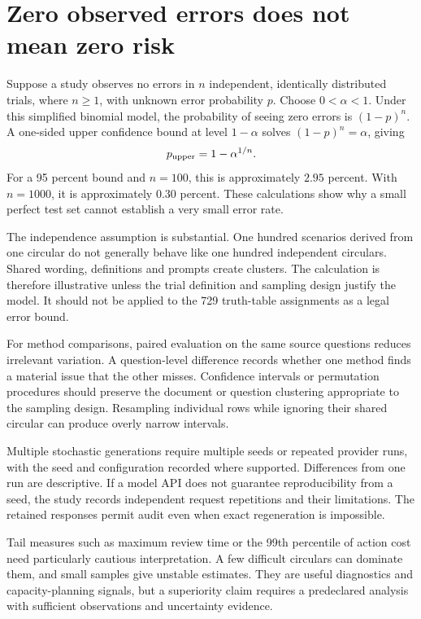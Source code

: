 \section{Zero observed errors does not mean zero risk}
\label{merge:M09:07}


Suppose a study observes no errors in $n$ independent, identically distributed
trials, where $n\geq1$, with unknown error probability $p$. Choose
$0<\alpha<1$. Under this simplified binomial model,
the probability of seeing zero errors is $(1-p)^n$. A one-sided upper confidence
bound at level $1-\alpha$ solves $(1-p)^n=\alpha$, giving
\begin{equation}
 p_{\rm upper}=1-\alpha^{1/n}.
 \label{eq:zero-errors}
\end{equation}
For a 95 percent bound and $n=100$, this is approximately $2.95$ percent. With
$n=1000$, it is approximately $0.30$ percent. These calculations show why a small
perfect test set cannot establish a very small error rate.

The independence assumption is substantial. One hundred scenarios derived from
one circular do not generally behave like one hundred independent circulars.
Shared wording, definitions and prompts create clusters. The calculation is
therefore illustrative unless the trial definition and sampling design justify
the model. It should not be applied to the 729 truth-table assignments as a legal
error bound.


For method comparisons, paired evaluation on the same source questions reduces
irrelevant variation. A question-level difference records whether one method
finds a material issue that the other misses. Confidence intervals or permutation
procedures should preserve the document or question clustering appropriate to the
sampling design. Resampling individual rows while ignoring their shared circular
can produce overly narrow intervals.

Multiple stochastic generations require multiple seeds or repeated provider runs,
with the seed and configuration recorded where supported. Differences from one
run are descriptive. If a model API does not guarantee reproducibility from a
seed, the study records independent request repetitions and their limitations.
The retained responses permit audit even when exact regeneration is impossible.

Tail measures such as maximum review time or the 99th percentile of action cost
need particularly cautious interpretation. A few difficult circulars can dominate
them, and small samples give unstable estimates. They are useful diagnostics and
capacity-planning signals, but a superiority claim requires a predeclared analysis
with sufficient observations and uncertainty evidence.

